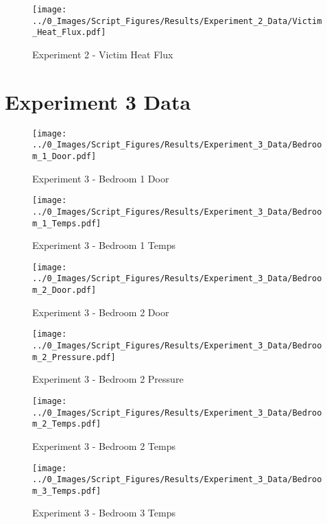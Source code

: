 	\begin{figure}[H]
		\centering
		\texttt{[image: ../0\_Images/Script\_Figures/Results/Experiment\_2\_Data/Victim\_Heat\_Flux.pdf]}
		\caption[]{Experiment 2 - Victim Heat Flux}
	\end{figure}
 
	\clearpage

\clearpage		\large
\section{Experiment 3 Data} \label{App:Exp3Results} 

	\begin{figure}[H]
		\centering
		\texttt{[image: ../0\_Images/Script\_Figures/Results/Experiment\_3\_Data/Bedroom\_1\_Door.pdf]}
		\caption[]{Experiment 3 - Bedroom 1 Door}
	\end{figure}
 

	\begin{figure}[H]
		\centering
		\texttt{[image: ../0\_Images/Script\_Figures/Results/Experiment\_3\_Data/Bedroom\_1\_Temps.pdf]}
		\caption[]{Experiment 3 - Bedroom 1 Temps}
	\end{figure}
 
	\clearpage

	\begin{figure}[H]
		\centering
		\texttt{[image: ../0\_Images/Script\_Figures/Results/Experiment\_3\_Data/Bedroom\_2\_Door.pdf]}
		\caption[]{Experiment 3 - Bedroom 2 Door}
	\end{figure}
 

	\begin{figure}[H]
		\centering
		\texttt{[image: ../0\_Images/Script\_Figures/Results/Experiment\_3\_Data/Bedroom\_2\_Pressure.pdf]}
		\caption[]{Experiment 3 - Bedroom 2 Pressure}
	\end{figure}
 
	\clearpage

	\begin{figure}[H]
		\centering
		\texttt{[image: ../0\_Images/Script\_Figures/Results/Experiment\_3\_Data/Bedroom\_2\_Temps.pdf]}
		\caption[]{Experiment 3 - Bedroom 2 Temps}
	\end{figure}
 

	\begin{figure}[H]
		\centering
		\texttt{[image: ../0\_Images/Script\_Figures/Results/Experiment\_3\_Data/Bedroom\_3\_Temps.pdf]}
		\caption[]{Experiment 3 - Bedroom 3 Temps}
	\end{figure}
 
